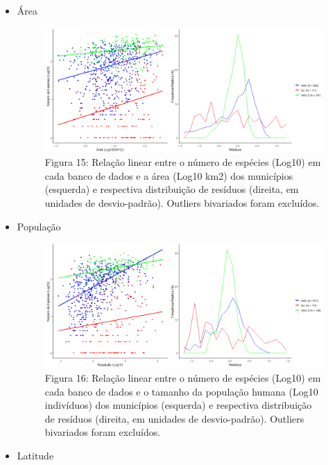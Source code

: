\begin{itemize}
\begin{itemize}
\item Área



\begin{figure}[h!]
\centering
\includegraphics[width = 15cm]{Imagens/32213.png}
\\{\scriptsize Figura 15: Relação linear entre o número de espécies (Log10) em cada banco de dados e a área (Log10 km2) dos municípios (esquerda) e respectiva distribuição de resíduos (direita, em unidades de desvio-padrão). Outliers bivariados foram excluídos.}
\end{figure}

\newpage

\item População

\begin{figure}[h!]
\centering
\includegraphics[width = 15cm]{Imagens/32313.png}
\\{\scriptsize Figura 16: Relação linear entre o número de espécies (Log10) em cada banco de dados e o tamanho da população humana (Log10 indivíduos) dos municípios (esquerda) e respectiva distribuição de resíduos (direita, em unidades de desvio-padrão). Outliers bivariados foram excluídos.}
\end{figure}


\item Latitude


\end{itemize}
\end{itemize}
